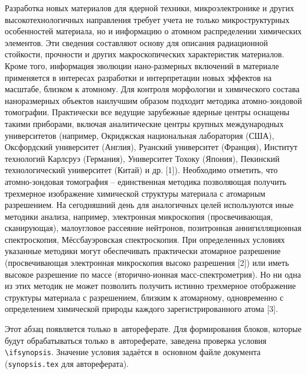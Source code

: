 
{\actuality} Разработка новых материалов для ядерной техники, микроэлектронике и других высокотехнологичных направления требует учета не только микроструктурных особенностей материала, но и информацию о атомном распределении химических элементов. Эти сведения составляют основу для описания радиационной стойкости, прочности и других макроскопических характеристик материалов. Кроме того, информация эволюции нано-размерных включений в материале применяется в интересах разработки и интерпретации новых эффектов на масштабе, близком к атомному.
Для контроля морфологии и химического состава наноразмерных объектов наилучшим образом подходит методика атомно-зондовой томографии. Практически все ведущие зарубежные ядерные центры оснащены такими приборами, включая аналитические центры крупных международных университетов (например, Окриджская национальная лаборатория (США), Оксфордский университет (Англия), Руанский университет (Франция), Институт технологий Карлсруэ (Германия), Университет Тохоку (Япония), Пекинский технологический университет (Китай) и др. [1]). Необходимо отметить, что атомно-зондовая томография – единственная методика позволяющая получить трехмерное изображение химической структуры материала с атомарным разрешением. На сегодняшний день для аналогичных целей используются иные методики анализа, например, электронная микроскопия (просвечивающая, сканирующая), малоугловое рассеяние нейтронов, позитронная аннигилляционная спектроскопия, Мёссбауэровская спектроскопия. При определенных условиях указанные методики могут обеспечивать практически атомарное разрешение (просвечивающая электронная микроскопия высоко разрешения [2]) или иметь высокое разрешение по массе (вторично-ионная масс-спектрометрия). Но ни одна из этих методик не может позволить получить истинно трехмерное отображение структуры материала с разрешением, близким к атомарному, одновременно с определением химической природы каждого зарегистрированного атома [3].


\ifsynopsis
Этот абзац появляется только в~автореферате.
Для формирования блоков, которые будут обрабатываться только в~автореферате,
заведена проверка условия \verb!\!\verb!ifsynopsis!.
Значение условия задаётся в~основном файле документа (\verb!synopsis.tex! для
автореферата).
\else
\fi


